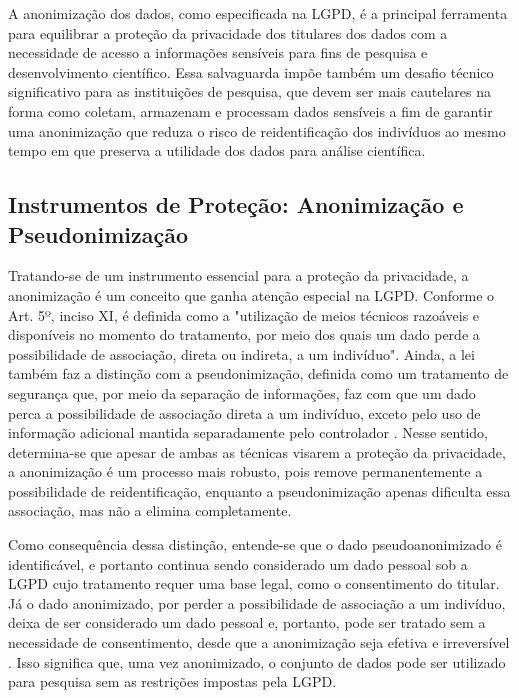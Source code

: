 A anonimização dos dados, como especificada na LGPD, é a principal ferramenta para equilibrar a proteção da privacidade dos titulares dos dados com a necessidade de acesso a informações sensíveis para fins de pesquisa e desenvolvimento científico. Essa salvaguarda impõe também um desafio técnico significativo para as instituições de pesquisa, que devem ser mais cautelares na forma como coletam, armazenam e processam dados sensíveis a fim de garantir uma anonimização que reduza o risco de reidentificação dos indivíduos ao mesmo tempo em que preserva a utilidade dos dados para análise científica.

\subsection{Instrumentos de Proteção: Anonimização e Pseudonimização}
\label{subsec:fund-anon-pseudo}
Tratando-se de um instrumento essencial para a proteção da privacidade, a anonimização é um conceito que ganha atenção especial na LGPD. Conforme o Art. 5º, inciso XI, é definida como a "utilização de meios técnicos razoáveis e disponíveis no momento do tratamento, por meio dos quais um dado perde a possibilidade de associação, direta ou indireta, a um indivíduo". Ainda, a lei também faz a distinção com a pseudonimização, definida como um tratamento de segurança que, por meio da separação de informações, faz com que um dado perca a possibilidade de associação direta a um indivíduo, exceto pelo uso de informação adicional mantida separadamente pelo controlador \cite[Art. 13, § 4º]{Brasil2018lgpd}. Nesse sentido, determina-se que apesar de ambas as técnicas visarem a proteção da privacidade, a anonimização é um processo mais robusto, pois remove permanentemente a possibilidade de reidentificação, enquanto a pseudonimização apenas dificulta essa associação, mas não a elimina completamente.

Como consequência dessa distinção, entende-se que o dado pseudoanonimizado é identificável, e portanto continua sendo considerado um dado pessoal sob a LGPD cujo tratamento requer uma base legal, como o consentimento do titular. Já o dado anonimizado, por perder a possibilidade de associação a um indivíduo, deixa de ser considerado um dado pessoal e, portanto, pode ser tratado sem a necessidade de consentimento, desde que a anonimização seja efetiva e irreversível \cite{Brasil2018lgpd}. Isso significa que, uma vez anonimizado, o conjunto de dados pode ser utilizado para pesquisa sem as restrições impostas pela LGPD.

